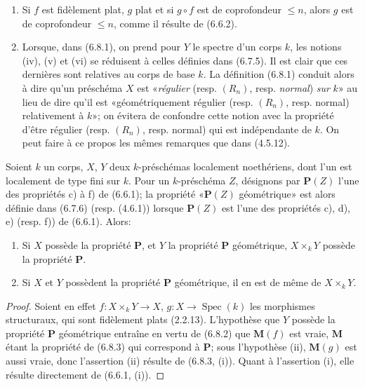 \begin{remarks}[6.8.4]
\label{IV.2.s6.8.4-fr}
\begin{enumerate}
\item[(i)] Si $f$ est fidèlement plat, $g$ plat et si $g\circ f$ est de
coprofondeur $\leq n$, alors $g$ est de coprofondeur $\leq n$, comme il
résulte de (6.6.2).
\item[(ii)] Lorsque, dans (6.8.1), on prend pour $Y$ le spectre d'un corps
$k$, les notions (iv), (v) et (vi) se réduisent à celles définies dans (6.7.5).
Il est clair que ces dernières sont relatives au corps de base $k$. La
définition (6.8.1) conduit alors à dire qu'un préschéma $X$ est «\emph{régulier}
(resp. $(R_n)$, resp. \emph{normal}) \emph{sur} $k$» au lieu de dire qu'il est
«géométriquement régulier (resp. $(R_n)$, resp. normal) relativement à $k$»;
on évitera de confondre cette notion avec la propriété d'être régulier (resp.
$(R_n)$, resp. normal) qui est indépendante de $k$. On peut faire à ce propos
les mêmes remarques que dans (4.5.12).
\end{enumerate}
\end{remarks}

\begin{proposition}[6.8.5]
\label{IV.2.s6.8.5-fr}
Soient $k$ un corps, $X$, $Y$ deux $k$-préschémas localement noethériens,
dont l'un est localement de type fini sur $k$. Pour un $k$-préschéma $Z$,
désignons par $\boldsymbol{P}(Z)$ l'une des propriétés \textup{c)} à \textup{f)} de \textup{(6.6.1)}; la propriété
«$\boldsymbol{P}(Z)$ géométrique» est alors définie dans \textup{(6.7.6) (resp. (4.6.1))} lorsque
$\boldsymbol{P}(Z)$ est l'une des propriétés \textup{c), d), e) (resp. f))} de \textup{(6.6.1)}. Alors:
\begin{enumerate}
\item[\textup{(i)}] Si $X$ possède la propriété $\boldsymbol{P}$, et $Y$ la propriété $\boldsymbol{P}$
géométrique, $X\times_kY$ possède la propriété $\boldsymbol{P}$.
\item[\textup{(ii)}] Si $X$ et $Y$ possèdent la propriété $\boldsymbol{P}$ géométrique, il en est
de même de $X\times_kY$.
\end{enumerate}
\end{proposition}

\begin{proof}
Soient en effet $f:X\times_kY\to X$, $g:X\to\operatorname{Spec}(k)$ les
morphismes structuraux, qui sont fidèlement plats (2.2.13). L'hypothèse que
$Y$ possède la propriété $\boldsymbol{P}$ géométrique entraîne en vertu de (6.8.2) que
$\boldsymbol{M}(f)$ est vraie, $\boldsymbol{M}$ étant la propriété de (6.8.3) qui correspond à $\boldsymbol{P}$; sous
l'hypothèse (ii), $\boldsymbol{M}(g)$ est aussi vraie, donc l'assertion (ii) résulte de
(6.8.3, (i)). Quant à l'assertion (i), elle résulte directement de (6.6.1, (i)).
\end{proof}

